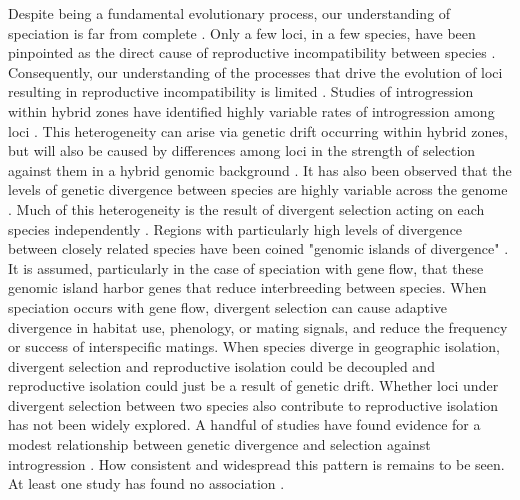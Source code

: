 Despite being a fundamental evolutionary process, our understanding of speciation 
is far from complete \parencite{butlin2011}. 
Only a few loci, in a few species, have been pinpointed as the direct cause of 
reproductive incompatibility between species \parencite{blackman2016,nosil2011}.
Consequently, our understanding of the processes that drive the evolution of loci
resulting in reproductive incompatibility is limited \parencite{butlin2011}. 
Studies of introgression within hybrid zones have identified highly variable
rates of introgression among loci \parencite{barton1985,gompert2017}.
This heterogeneity can arise via genetic drift occurring within hybrid zones,
but will also be caused by differences among loci in the strength of selection 
against them in a hybrid genomic background \parencite{barton1985,gompert2017}. 
It has also been observed that the levels of genetic divergence between species 
are highly variable across the genome \parencite{nosil2009}.
Much of this heterogeneity is the result of divergent selection acting on each 
species independently \parencite{nosil2009}.
Regions with particularly high levels of divergence between closely related species have been 
coined "genomic islands of divergence" \parencite{wolf2017}. 
It is assumed, particularly in the case of speciation with gene flow, that these
genomic island harbor genes that reduce interbreeding between species. 
When speciation occurs with gene flow, divergent selection can cause 
adaptive divergence in habitat use, phenology, or mating signals, and reduce the
frequency or success of interspecific matings. 
When species diverge in geographic isolation, divergent selection and reproductive
isolation could be decoupled and reproductive isolation could just be a result
of genetic drift.
Whether loci under divergent selection between two species also contribute to 
reproductive isolation has not been widely explored.
A handful of studies have found evidence for a modest relationship between 
genetic divergence and selection against introgression \parencite{nikolakis2022,gompert2012a,parchman2013,larson2013}.
How consistent and widespread this pattern is remains to be seen.
At least one study has found no association \parencite{jahner2021}.

